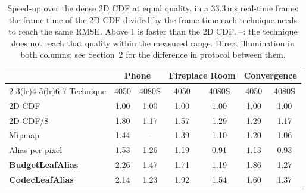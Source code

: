 \begin{table}[H]
\centering\small
\setlength{\tabcolsep}{5pt}
\caption{Speed-up over the dense 2D CDF at equal quality, in a 33.3\,ms real-time frame: the frame time of the 2D CDF divided by the frame time each technique needs to reach the same RMSE. Above 1 is faster than the 2D CDF. --: the technique does not reach that quality within the measured range. Direct illumination in both columns; see Section~2 for the difference in protocol between them.}
\label{tab:eq}
\begin{tabular}{l cc cc cc}
\toprule
 & \multicolumn{2}{c}{Phone} & \multicolumn{2}{c}{Fireplace Room} & \multicolumn{2}{c}{Convergence} \\
\cmidrule(lr){2-3}\cmidrule(lr){4-5}\cmidrule(lr){6-7}
Technique & 4050 & 4080S & 4050 & 4080S & 4050 & 4080S \\
\midrule
2D CDF & 1.00 & 1.00 & 1.00 & 1.00 & 1.00 & 1.00 \\
2D CDF/8 & 1.80 & 1.17 & 1.57 & 1.29 & 1.29 & 1.17 \\
Mipmap & 1.44 & -- & 1.39 & 1.10 & 1.20 & 1.06 \\
Alias per pixel & 1.53 & 1.26 & 1.19 & 0.91 & 1.13 & 0.93 \\
\textbf{BudgetLeafAlias} & 2.26 & 1.47 & 1.71 & 1.19 & 1.86 & 1.27 \\
\textbf{CodecLeafAlias} & 2.14 & 1.23 & 1.92 & 1.54 & 1.60 & 1.37 \\
\bottomrule
\end{tabular}
\end{table}
